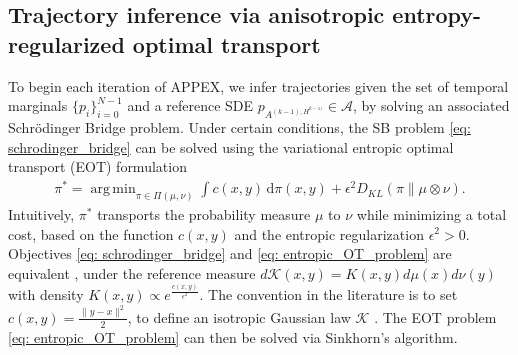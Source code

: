 \documentclass[twoside,11pt]{article}
\newcommand{\R} {\mathbb R}
\DeclareMathOperator*{\argmin}{arg\,min}
\newcommand{\todo}[1]{\textbf{\textcolor{red}{TODO: #1}}}
\begin{document}



\subsection{Trajectory inference via anisotropic entropy-regularized optimal transport}
To begin each iteration of APPEX, we infer trajectories given the set of temporal marginals $\{p_i\}_{i=0}^{N-1}$ and a reference SDE $p_{A^{(k-1), H^{k-1)}}} \in \mathcal{A}$, by solving an associated Schr\"odinger Bridge problem. Under certain conditions, the SB problem \eqref{eq: schrodinger_bridge} can be solved using the variational entropic optimal transport (EOT) formulation
\begin{align}
\pi^* = \argmin_{\pi \in \Pi(\mu,\nu)} \int c(x,y) \, \mathrm{d}\pi(x,y) + \epsilon ^2D_{KL}(\pi \| \mu \otimes \nu).
\label{eq: entropic_OT_problem}
\end{align}
Intuitively, $\pi^*$ transports the probability measure $\mu$ to $\nu$ while minimizing a total cost, based on the function $c(x,y)$ and the entropic regularization $\epsilon^2 > 0$. Objectives  \eqref{eq: schrodinger_bridge} and \eqref{eq: entropic_OT_problem} are equivalent \citep{peyre2019computational, zhang2024joint}, under the reference measure $d\mathcal{K}(x,y)=K(x,y)d\mu(x)d\nu(y)$ with density $K(x,y) \propto e^{\frac{c(x,y)}{\epsilon^2}}$. The convention in the literature is to set $c(x,y)= \frac{\|y-x\|^2}{2}$, to define an isotropic Gaussian law $\mathcal{K}$ \citep{janati2020entropic, lavenant2021towards,  chizat2022trajectory, zhang2024joint}. The EOT problem \eqref{eq: entropic_OT_problem} can then be solved via Sinkhorn's algorithm. 
\end{document}
